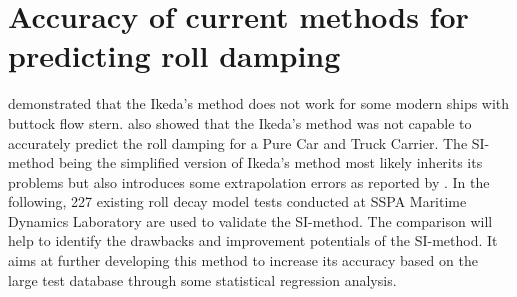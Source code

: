 \section{Accuracy of current methods for predicting roll damping}
\label{se:accuracy_SI_method}
\parencite{kawahara_simple_2011} demonstrated that the Ikeda's method does not work for some modern ships with buttock flow stern. \parencite{soder_assessment_2019} also showed that the Ikeda's method was not capable to accurately predict the roll damping for a Pure Car and Truck Carrier. The SI-method being the simplified version of Ikeda's method most likely inherits its problems but also introduces some extrapolation errors as reported by \parencite{rudakovic_application_2017}. In the following, 227 existing roll decay model tests conducted at SSPA Maritime Dynamics Laboratory are used to validate the SI-method. The comparison will help to identify the drawbacks and improvement potentials of the SI-method. It aims at further developing this method to increase its accuracy based on the large test database through some statistical regression analysis.






